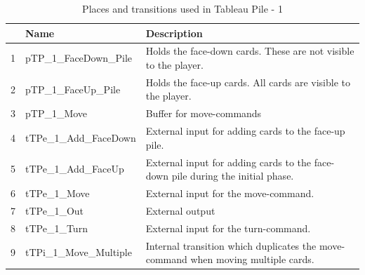 \documentclass[runningheads,a4paper]{llncs}
\begin{document}
\begin{table}
	\caption{Places and transitions used in Tableau Pile - 1}
	\begin{tabular}{|l|l|l|}
		\hline
		& Name & Description \\
		\hline
		1 & pTP\_1\_FaceDown\_Pile    &  Holds the face-down cards. These are not visible to the player.\\ \hline
		2 & pTP\_1\_FaceUp\_Pile      &  Holds the face-up cards. All cards are visible to the player.\\ \hline
		3 & pTP\_1\_Move              &  Buffer for move-commands\\ \hline
		4 & tTPe\_1\_Add\_FaceDown   &  External input for adding cards to the face-up pile.  \\ \hline
		5 & tTPe\_1\_Add\_FaceUp     &  External input for adding cards to the face-down pile during the initial phase.  \\ \hline
		6 & tTPe\_1\_Move            &  External input for the move-command.  \\ \hline
		7 & tTPe\_1\_Out             &  External output  \\ \hline
		8 & tTPe\_1\_Turn            &  External input for the turn-command.  \\ \hline
		9 & tTPi\_1\_Move\_Multiple  &  Internal transition which duplicates the move-command when moving multiple cards.  \\ \hline
	\end{tabular}
\end{table}
\clearpage
\end{document}
